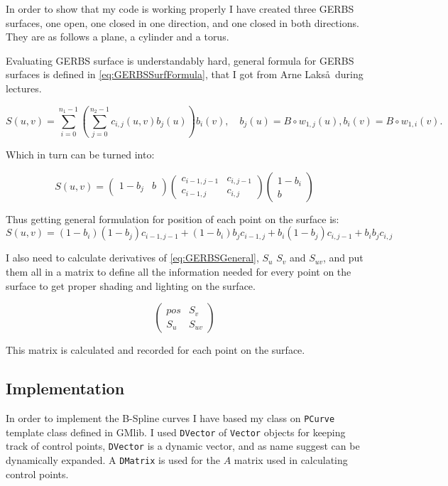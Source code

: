 \documentclass[a4paper,12pt]{extarticle}
\begin{document}
In order to show that my code is working properly I have created three GERBS surfaces, one open, one closed in one direction, and one closed in both directions. They are as follows a plane, a cylinder and a torus.

Evaluating GERBS surface is understandably hard, general formula for GERBS surfaces is defined in \cref{eq:GERBSSurfFormula}, that I got from Arne Laks\aa\, during lectures.

\begin{equation}
S(u,v)= \sum_{i=0}^{n_1-1} \left( \sum_{j=0}^{n_2-1} c_{i,j}(u,v) b_j(u) \right) b_i(v), \quad b_j(u) = B \circ w_{1,j}(u), b_i(v) = B \circ w_{1,i}(v).
\label{eq:GERBSSurfFormula}
\end{equation}

Which in turn can be turned into:

\begin{equation}
S(u,v)=
\begin{pmatrix}
1-b_j & b
\end{pmatrix}
\begin{pmatrix}
c_{i-1,j-1} & c_{i,j-1}\\
c_{i-1,j} & c_{i,j}
\end{pmatrix}
\begin{pmatrix}
1-b_i \\
b
\end{pmatrix}
\end{equation}

Thus getting general formulation for position of each point on the surface is:
\begin{equation}
  S(u,v)= (1-b_i) (1-b_j) c_{i-1,j-1} + (1-b_i) b_j c_{i-1,j} + b_i (1-b_j) c_{i,j-1} + b_i b_j c_{i,j}
  \label{eq:GERBSGeneral}
\end{equation}

I also need to calculate derivatives of \cref{eq:GERBSGeneral}, $S_u$ $S_v$ and $S_{uv}$, and put them all in a matrix to define all the information needed for every point on the surface to get proper shading and lighting on the surface.

\begin{equation}
\begin{pmatrix}
pos & S_v\\
S_u & S_{uv}
\end{pmatrix}
\end{equation}

This matrix is calculated and recorded for each point on the surface.

\subsection{Implementation}
In order to implement the B-Spline curves I have based my class on \verb|PCurve| template class defined in GMlib. I used \verb|DVector| of \verb|Vector| objects for keeping track of control points, \verb|DVector| is a dynamic vector, and as name suggest can be dynamically expanded. A \verb|DMatrix| is used for the $A$ matrix used in calculating control points.
\end{document}
